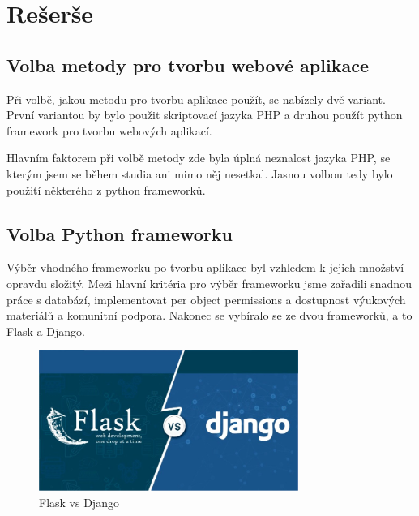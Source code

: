 \chapter{Rešerše}
\label{1-reserse}

\section{Volba metody pro tvorbu webové aplikace}

Při volbě, jakou metodu pro tvorbu aplikace použít, se nabízely dvě
variant. První variantou by bylo použit skriptovací jazyka PHP a
druhou použít python framework pro tvorbu webových aplikací.

Hlavním faktorem při volbě metody zde byla úplná neznalost jazyka PHP,
se kterým jsem se během studia ani mimo něj nesetkal. Jasnou volbou
tedy bylo použití některého z python frameworků.

\section{Volba Python frameworku}
Výběr vhodného frameworku po tvorbu aplikace byl vzhledem k jejich
množství opravdu složitý. Mezi hlavní kritéria pro výběr frameworku
jsme zařadili snadnou práce s databází, implementovat per object
permissions a dostupnost výukových materiálů a komunitní
podpora. Nakonec se vybíralo se ze dvou frameworků, a to Flask a
Django.

\begin{figure}[H] \centering
    \includegraphics[width=240pt]{./pictures/1-django-vs-flask.jpeg}
    \caption[Flask vs Django]{Flask vs Django \cite{}}
	\label{fig:Flask vs Django}                                
\end{figure}

